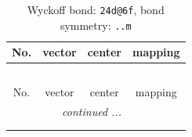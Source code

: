 \documentclass[fleqn,8pt]{jsarticle}
\begin{document}
\renewcommand{\arraystretch}{1.2}
\begin{longtable}{cccc}
\caption{Wyckoff bond: {\tt 24d@6f}, bond symmetry: {\tt ..m}}
 \\
 \hline \hline
No. & vector & center & mapping \\ \hline \endfirsthead

\multicolumn{3}{l}{\tablename\ \thetable{}} \\
 \hline \hline
No. & vector & center & mapping \\ \hline \endhead

 \hline \hline
\multicolumn{3}{r}{\footnotesize\it continued ...} \\ \endfoot

 \hline \hline
\multicolumn{3}{r}{} \\ \endlastfoot


\end{longtable}
\end{document}
